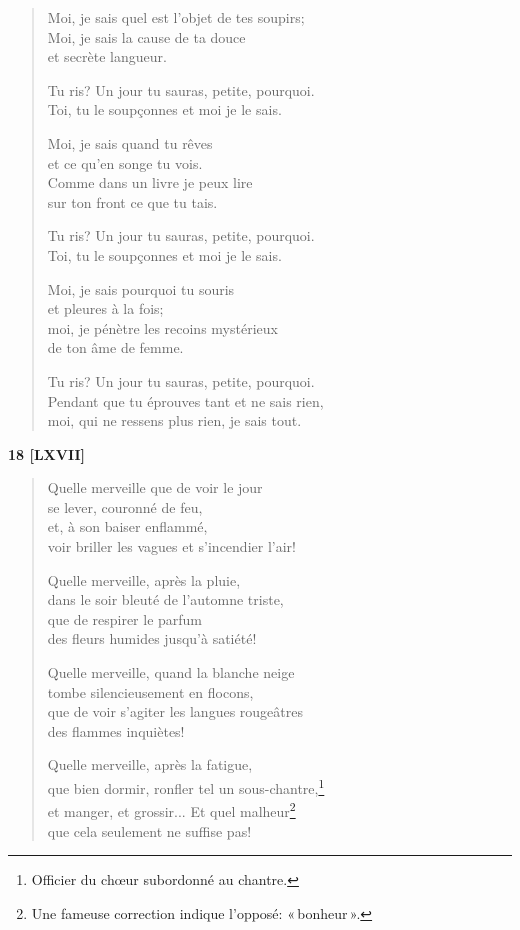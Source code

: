 \begin{verse}
  Moi, je sais quel est l'objet
  de tes soupirs; \\
  Moi, je sais la cause de ta douce \\
  et secrète langueur.

  Tu ris? Un jour
  tu sauras, petite, pourquoi. \\
  Toi, tu le soupçonnes
  et moi je le sais.

  Moi, je sais quand tu rêves \\
  et ce qu'en songe tu vois. \\
  Comme dans un livre je peux lire \\
  sur ton front ce que tu tais.

  Tu ris? Un jour
  tu sauras, petite, pourquoi. \\
  Toi, tu le soupçonnes
  et moi je le sais.

  Moi, je sais pourquoi tu souris \\
  et pleures à la fois; \\
  moi, je pénètre les recoins mystérieux \\
  de ton âme de femme.

  Tu ris? Un jour
  tu sauras, petite, pourquoi. \\
  Pendant que tu éprouves tant et ne sais rien, \\
  moi, qui ne ressens plus rien, je sais tout.
\end{verse}


\begin{center}
  \textbf{18 [LXVII]}
\end{center}

\begin{verse}
  Quelle merveille que de voir le jour \\
  se lever, couronné de feu, \\
  et, à son baiser enflammé, \\
  voir briller les vagues et s'incendier l'air!

  Quelle merveille, après la pluie, \\
  dans le soir bleuté de l'automne triste, \\
  que de respirer le parfum \\
  des fleurs humides jusqu'à satiété!

  Quelle merveille, quand la blanche neige \\
  tombe silencieusement en flocons, \\
  que de voir s'agiter les langues rougeâtres \\
  des flammes inquiètes!

  Quelle merveille, après la fatigue, \\
  que bien dormir, ronfler tel un
  sous\hyp{}chantre,\footnote{Officier du chœur subordonné au chantre.} \\
  et manger, et grossir... Et quel malheur\footnote{Une fameuse
  correction indique l'opposé: «\,bonheur\,».} \\
  que cela seulement ne suffise pas!
\end{verse}

